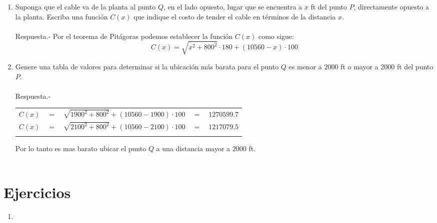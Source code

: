 \begin{enumerate}
\begin{enumerate}[\bfseries a.]
	\item Suponga que el cable va de la planta al punto $Q$, en el lado opuesto, lugar que se encuentra a $x$ ft del punto $P$, directamente opuesto a la planta. Escriba una función $C(x)$ que indique el costo de tender el cable en términos de la distancia $x$.\\\\
	    Respuesta.-\; Por el teorema de Pitágoras podemos establecer la función $C(x)$ como sigue: $$C(x)=\sqrt{x^2 + 800^2} \cdot 180 + (10560-x)\cdot 100$$

	\item Genere una tabla de valores para determinar si la ubicación más barata para el punto $Q$ es menor a $2000$ ft o mayor a $2000$ ft del punto $P$.\\\\
	    Respuesta.-\;
	    \begin{center}
		\begin{tabular}{rclcl}
		    $C(x)$&$=$&$\sqrt{1900^2+800^2} + (10560-1900)\cdot 100$&$=$&$1270599.7$\\
		    $C(x)$&$=$&$\sqrt{2100^2+800^2} + (10560-2100)\cdot 100$&$=$&$1217079.5$\\\\
		\end{tabular}
	    \end{center}
	    Por lo tanto es mas barato ubicar el punto $Q$ a una distancia mayor a $2000$ ft.\\\\

    \end{enumerate}

\end{enumerate}

\section{Ejercicios}

\begin{enumerate}

\item
\end{enumerate}
